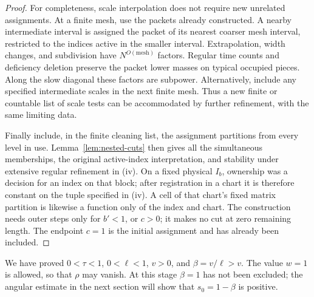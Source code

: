\begin{proof}
For completeness, scale interpolation does not require new unrelated
assignments. At a finite mesh, use the packets already constructed.
A nearby intermediate interval is assigned the packet of its nearest
coarser mesh interval, restricted to the indices active in the smaller
interval. Extrapolation, width changes, and subdivision have
$N^{O(\text{mesh})}$ factors. Regular time counts and deficiency deletion
preserve the packet lower masses on typical occupied pieces. Along the
slow diagonal these factors are subpower. Alternatively, include any
specified intermediate scales in the next finite mesh. Thus a new
finite or countable list of scale tests can be accommodated by further
refinement, with the same limiting data.

Finally include, in the finite cleaning list, the assignment partitions
from every level in use. Lemma~\ref{lem:nested-cuts} then gives all the
simultaneous memberships, the original active-index interpretation, and
stability under extensive regular refinement in (iv). On a fixed
physical $I_b$, ownership was a decision for an index on that block;
after registration in a chart it is therefore constant on the tuple
specified in (iv). A cell of that chart's fixed matrix partition is
likewise a function only of the index and chart. The construction needs
outer steps only for $b'<1$, or $c>0$; it makes no cut at zero remaining
length. The endpoint $c=1$ is the initial assignment and has already been
included.
\end{proof}

We have proved $0<\tau<1$, $0<\ell<1$, $v>0$, and
$\beta=v/\ell>v$. The value $w=1$ is allowed, so that $\rho$ may
vanish. At this stage $\beta=1$ has not been excluded; the angular
estimate in the next section will show that $s_0=1-\beta$ is positive.

